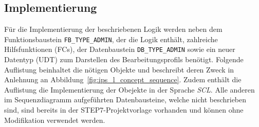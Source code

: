 


\subsection{Implementierung}
\label{subsec:ips_l_implementation}

Für die Implementierung der beschriebenen Logik werden neben dem Funktionsbaustein \texttt{FB\_TYPE\_ADMIN}, der die Logik enthält, zahlreiche Hilfsfunktionen (FCs), der Datenbaustein \texttt{DB\_TYPE\_ADMIN} sowie ein neuer Datentyp (UDT) zum Darstellen des Bearbeitungsprofils benötigt. Folgende Auflistung beinhaltet die nötigen Objekte und beschreibt deren Zweck in Anlehnung an Abbildung~\ref{fig:ips_l_concept_sequence}. Zudem enthält die Auflistung die Implementierung der Obejekte in der Sprache \emph{SCL}. Alle anderen im Sequenzdiagramm aufgeführten Datenbausteine, welche nicht beschrieben sind, sind bereits in der STEP7-Projektvorlage vorhanden und können ohne Modifikation verwendet werden. 


